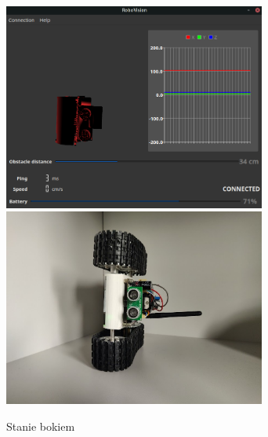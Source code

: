 \documentclass[12pt,a4paper,polish]{article}
\begin{document}
  \begin{figure}[h]
    \centering
    \includegraphics[width=0.77\textwidth]{img/final/4.png}
    \includegraphics[width=0.77\textwidth]{img/final/4e.jpg}
    \caption{Stanie bokiem}
    \label{fig:test4}
  \end{figure}


  
  


\end{document}
